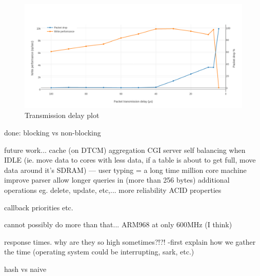 \begin{figure}
\begin{center}
	\includegraphics[width=1.4\textwidth, natwidth=1063, natheight=509]{images/transmission_delay.png}
\end{center}
\caption{Transmission delay plot}
\label{fig:die-plot}
\end{figure}


done:
blocking vs non-blocking

future work...
cache (on DTCM)
aggregation
CGI server
self balancing when IDLE (ie. move data to cores with less data, if a table is about to get full, move data around it's SDRAM) --- user typing = a long time
million core machine
improve parser
allow longer queries in (more than 256 bytes)
additional operations eg. delete, update, etc,...
more reliability
ACID properties



callback priorities etc.

cannot possibly do more than that...
ARM968 at only 600MHz (I think)

response times. why are they so high sometimes?!?!
-first explain how we gather the time (operating system could be interrupting, sark, etc.)


hash vs naive
